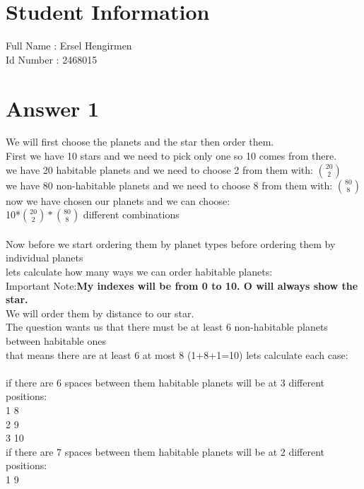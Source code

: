 \documentclass[11pt]{article}
\begin{document}
\section*{Student Information } 
Full Name : Ersel Hengirmen  \\
Id Number : 2468015 \\

\section*{Answer 1}
We will first choose the planets and the star then order them.\\
First we have 10 stars and we need to pick only one so 10 comes from there.\\
we have 20 habitable planets and we need to choose 2 from them with: $\binom{20}{2}$\\
we have 80 non-habitable planets and we need to choose 8 from them with: $\binom{80}{8}$\\
now we have chosen our planets and we can choose:\\
10*$\binom{20}{2}*\binom{80}{8}$ different combinations\\
\\
Now before we start ordering them by planet types before ordering them by individual planets\\
lets calculate how many ways we can order habitable planets:\\
Important Note:\textbf{My indexes will be from 0 to 10. O will always show the star.}\\
We will order them by distance to our star.\\
The question wants us that there must be at least 6 non-habitable planets between habitable ones\\
that means there are at least 6 at most 8 (1+8+1=10) lets calculate each case:\\
\\
if there are 6 spaces between them habitable planets will be at 3 different positions:\\
1 8\\
2 9\\
3 10\\
if there are 7 spaces between them habitable planets will be at 2 different positions:\\
1 9\\
\end{document}
